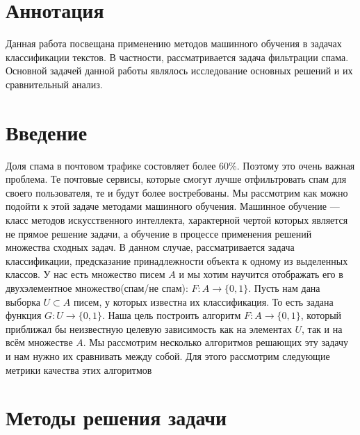 \documentclass[a4paper, 14pt]{extarticle}
\begin{document}
	
	\tableofcontents
		
	\newpage
	
	
	\section*{Аннотация}
		Данная работа посвещана применению методов машинного обучения в задачах классификации текстов. В частности, рассматривается задача фильтрации спама. Основной задачей данной работы являлось исследование основных решений и их сравнительный анализ. 
	
	\newpage
	
	\section{Введение}
        Доля спама в почтовом трафике состовляет более 60\%. Поэтому это очень важная проблема. Те почтовые сервисы, которые смогут лучше отфильтровать спам для своего пользователя, те и будут более востребованы. Мы рассмотрим как можно подойти к этой задаче методами машинного обучения.\newline
        Машинное обучение — класс методов искусственного интеллекта, характерной чертой которых является не прямое решение задачи, а обучение в процессе применения решений множества сходных задач.
        В данном случае, рассматривается задача классификации, предсказание принадлежности объекта к одному из выделенных классов.
        У нас есть множество писем $A$ и мы хотим научится отображать его в двухэлементное множество(спам/не спам): 
        $F : A \to \{0, 1\}$.\newline
        Пусть нам дана выборка $U\subset A$  писем, у которых известна их классификация. То есть задана функция $G : U \to \{0, 1\}$. Наша цель построить алгоритм $F : A \to \{0, 1\}$, который приближал бы неизвестную целевую зависимость как на элементах $U$, так и на всём множестве $A$. Мы рассмотрим несколько алгоритмов решающих эту задачу и нам нужно их сравнивать между собой. Для этого 
        рассмотрим следующие метрики качества этих алгоритмов 
        
    \section{Методы решения задачи}
\end{document}
